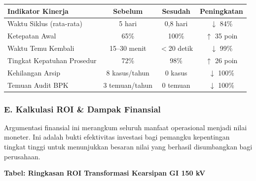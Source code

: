 \documentclass[12pt,a4paper]{report}
\begin{document}
\vspace{0.2cm}
\noindent
\small
\begin{tabularx}{\textwidth}{@{} >{\raggedright\arraybackslash}X c c c @{}}
\toprule
\textbf{Indikator Kinerja} & \textbf{Sebelum} & \textbf{Sesudah} & \textbf{Peningkatan} \\
\midrule
Waktu Siklus (rata-rata) & 5 hari & 0,8 hari & $\downarrow$ 84\% \\
Ketepatan Awal & 65\% & 100\% & $\uparrow$ 35 poin \\
Waktu Temu Kembali & 15--30 menit & $<$20 detik & $\downarrow$ 99\% \\
Tingkat Kepatuhan Prosedur & 72\% & 98\% & $\uparrow$ 26 poin \\
Kehilangan Arsip & 8 kasus/tahun & 0 kasus & $\downarrow$ 100\% \\
Temuan Audit BPK & 3 temuan/tahun & 0 temuan & $\downarrow$ 100\% \\
\bottomrule
\end{tabularx}

\subsubsection*{E. Kalkulasi ROI \& Dampak Finansial}
Argumentasi finansial ini merangkum seluruh manfaat operasional menjadi nilai moneter. Ini adalah bukti efektivitas investasi bagi pemangku kepentingan tingkat tinggi untuk menunjukkan besaran nilai yang berhasil disumbangkan bagi perusahaan.

\vspace{0.3cm}
\noindent
{\small\bfseries Tabel: Ringkasan ROI Transformasi Kearsipan GI 150 kV}
\end{document}

